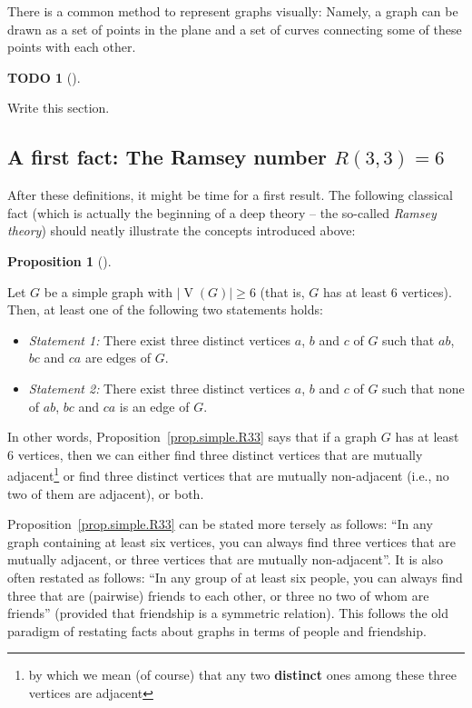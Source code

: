 \documentclass[numbers=enddot,12pt,final,onecolumn,notitlepage]{scrartcl}%
\theoremstyle{definition}
\newtheorem{prop}[theo]{Proposition}
\newenvironment{proposition}[1][]
{\begin{prop}[#1]\begin{leftbar}}
{\end{leftbar}\end{prop}}
\newtheorem{quest}[theo]{TODO}
\newenvironment{todo}[1][]
{\begin{quest}[#1]\begin{leftbar}}
{\end{leftbar}\end{quest}}
\newcommand{\abs}[1]{\left| #1 \right|}
\newcommand{\tup}[1]{\left( #1 \right)}
\newcommand{\verts}[1]{\operatorname{V}\left( #1 \right)}
\begin{document}
There is a common method to represent graphs visually: Namely, a graph
can be drawn as a set of points in the plane and a set of curves
connecting some of these points with each other.
\begin{todo}
Write this section.
\end{todo}

\subsection{\label{sect.intro.R33}A first fact: The Ramsey number
$R\tup{3,3} = 6$}

After these definitions, it might be time for a first result. The
following classical fact (which is actually the beginning of a deep
theory -- the so-called \textit{Ramsey theory}) should neatly
illustrate the concepts introduced above:

\begin{proposition} \label{prop.simple.R33}
Let $G$ be a simple graph with $\abs{\verts{G}} \geq 6$ (that is,
$G$ has at least $6$ vertices). Then, at least one of the following
two statements holds:

\begin{itemize}
\item \textit{Statement 1:} There exist three distinct vertices $a$,
$b$ and $c$ of $G$ such that $ab$, $bc$ and $ca$ are edges of $G$.

\item \textit{Statement 2:} There exist three distinct vertices $a$,
$b$ and $c$ of $G$ such that none of $ab$, $bc$ and $ca$ is an edge of
$G$.
\end{itemize}
\end{proposition}

In other words, Proposition~\ref{prop.simple.R33} says that if a graph
$G$ has at least $6$ vertices, then we can either find three distinct
vertices that are mutually adjacent\footnote{by which we mean (of
course) that any two \textbf{distinct} ones among these three vertices
are adjacent} or find three distinct vertices that are mutually
non-adjacent (i.e., no two of them are adjacent), or both.

Proposition~\ref{prop.simple.R33} can be stated more tersely as
follows: ``In any graph containing at least six vertices, you can
always find three vertices that are mutually adjacent, or three
vertices that are mutually non-adjacent''. It is also often restated
as follows:
``In any group of at least six people, you can always find three that
are (pairwise) friends to each other, or three no two of whom are
friends'' (provided that friendship is a symmetric relation). This
follows the old paradigm of restating facts about graphs in terms of
people and friendship.
\end{document}
